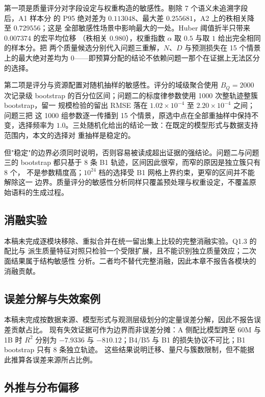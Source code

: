 \documentclass[bwprint]{gmcmthesis}
\numberwithin{equation}{section}
\numberwithin{figure}{section}
\numberwithin{table}{section}
\begin{document}
第一项是质量评分对字段设定与权重构造的敏感性。剔除 7 个语义未追溯字段后，A1 样本分
的 P95 绝对差为 $0.113048$、最大差 $0.255681$，A2 上的秩相关降至 $0.729556$；这是
全部敏感性场景中影响最大的一处。Huber 阈值折半只带来 $0.007374$ 的宏平均位移
（秩相关 $0.980$），权重指数 $\alpha$ 取 $0.5$ 与取 $1$ 给出完全相同的样本分。把
两个质量候选分别代入问题三重解，$N$、$D$ 与预测损失在 15 个情景上的最大绝对差均为
$0$——即预算分配的结论不依赖问题一那个在证据上无法区分的选择。

第二项是评分与资源配置对随机抽样的敏感性。评分的域级聚合使用 $B_Q=2000$ 次记录级
bootstrap 的百分位区间；问题二的标度律参数使用 1000 次整轨迹整簇 bootstrap，留一
规模检验的留出 RMSE 落在 $1.02\times10^{-4}$ 至 $2.20\times10^{-4}$ 之间；问题三把
这 1000 组参数逐一传播到 15 个情景，原选中点在全部重抽样中保持不变，选择频率为
$1.0$。三处随机化给出的结论一致：在既定的模型形式与数据支持范围内，本文的选择对
重抽样是稳定的。

但"稳定"的边界必须同时说明，否则容易被读成超出证据的强结论。问题二与问题三的
bootstrap 都只基于 8 条 B1 轨迹，区间因此很窄，而窄的原因是独立簇只有 8 个，
不是参数精度高；$10^{24}$ 档的选择受 B1 网格上界约束，更窄的区间并不能解除这一
边界。质量评分的敏感性分析同样只覆盖预处理与权重设定，不覆盖原始语料的生成过程。

\subsection{消融实验}

本稿未完成逐模块移除、重拟合并在统一留出集上比较的完整消融实验。Q1.3 的配比与
派生质量特征对照只检验一个受限扩展，且不能识别独立质量效应；二次面结果属于结构敏感性
分析。二者均不替代完整消融，因此本章不报告各模块的消融贡献。

\subsection{误差分解与失效案例}

本稿未完成按数据来源、模型形式与观测层级划分的定量误差分解，因此不报告误差贡献占比。
现有失效证据可作为边界而非误差分摊：A 侧配比模型跨至 60M 与 1B 时 $R^2$ 分别为
$-7.9336$ 与 $-810.12$；B4/B5 与 B1 的损失协议不可比；B1 bootstrap 只有 8 条独立轨迹。
这些结果说明迁移、量尺与簇数限制，但不能据此推算各误差来源所占比例。

\subsection{外推与分布偏移}
\end{document}
